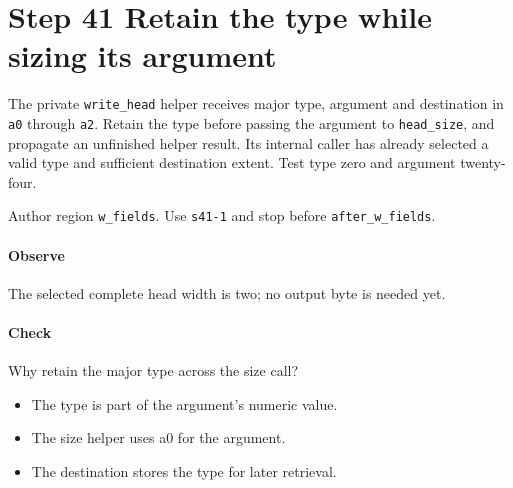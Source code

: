 \section{Step 41 Retain the type while sizing its argument}\label{cbor-s41}
The private \texttt{write\_head} helper receives major type, argument and destination in \texttt{a0} through \texttt{a2}. Retain the type before passing the argument to \texttt{head\_size}, and propagate an unfinished helper result. Its internal caller has already selected a valid type and sufficient destination extent. Test type zero and argument twenty-four.

Author region \texttt{w\_fields}. Use \texttt{s41-1} and stop before \texttt{after\_w\_fields}.

\paragraph{Observe} The selected complete head width is two; no output byte is needed yet.

\paragraph{Check} Why retain the major type across the size call?
\begin{itemize}
  \item[A.] The type is part of the argument's numeric value.
  \item[B.] The size helper uses a0 for the argument.
  \item[C.] The destination stores the type for later retrieval.
\end{itemize}
